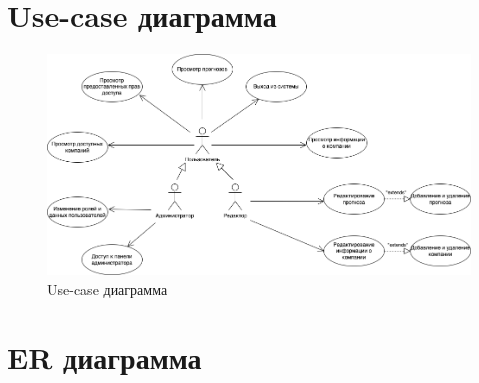 \newpage
\section{Use-case диаграмма}

\begin{figure}[h!]
	\begin{center}
		\includegraphics[scale=0.5]{img/use-case.png}
	\end{center}
	\captionsetup{justification=centering}
	\caption{Use-case диаграмма}
	\label{img:use-case}
\end{figure}

\newpage
\section{ER диаграмма}

